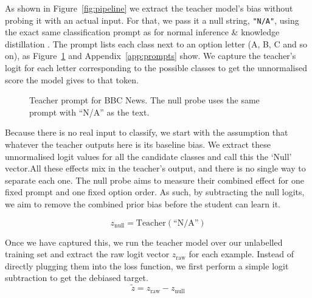 \documentclass[11pt]{article}
\begin{document}
As shown in Figure~\ref{fig:pipeline} we extract the teacher model's bias without probing it with an actual input.
For that, we pass it a null string, \texttt{"N/A"}, using the exact same classification prompt as for normal inference \& knowledge distillation \citep{zhao2021calibrate}.
The prompt lists each class next to an option letter (A, B, C and so on), as Figure~\ref{fig:prompt} and Appendix~\ref{app:prompts} show.
We capture the teacher's logit for each letter corresponding to the possible classes to get the unnormalised score the model gives to that token.

\begin{figure}[t]
\centering
{}
\caption{Teacher prompt for BBC News. The null probe uses the same prompt with ``N/A'' as the text.}
\label{fig:prompt}
\end{figure}

Because there is no real input to classify, we start with the assumption that whatever the teacher outputs here is its baseline bias.
We extract these unnormalised logit values for all the candidate classes and call this the `Null' vector.All these effects mix in the teacher's output, and there is no single way to separate each one.
The null probe aims to measure their combined effect for one fixed prompt and one fixed option order.
As such, by subtracting the null logits, we aim to remove the combined prior bias before the student can learn it.

\begin{equation}
z_{\text{null}} = \text{Teacher}(\text{``N/A''})
\end{equation}

Once we have captured this, we run the teacher model over our unlabelled training set and extract the raw logit vector $z_{\text{raw}}$ for each example.
Instead of directly plugging them into the loss function, we first perform a simple logit subtraction to get the debiased target.
\begin{equation}
\tilde{z} = z_{\text{raw}} - z_{\text{null}}
\end{equation}
\end{document}
